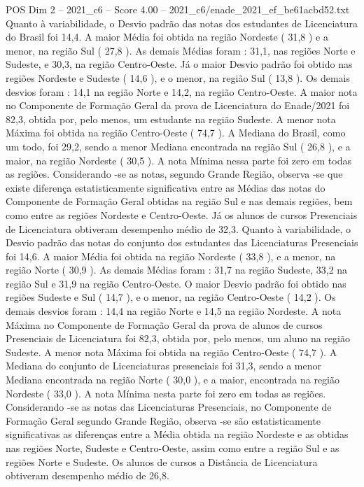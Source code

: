 \begin{textsample}{POS Dim 2 – 2021\_c6 – Score 4.00 – 2021\_c6/enade\_2021\_ef\_be61acbd52.txt}
Quanto à variabilidade, o Desvio padrão das notas dos estudantes de Licenciatura do Brasil foi 14,4.
A maior Média foi obtida na região Nordeste ( 31,8 ) e a menor, na região Sul ( 27,8 ).
As demais Médias foram : 31,1, nas regiões Norte e Sudeste, e 30,3, na região Centro-Oeste.
Já o maior Desvio padrão foi obtido nas regiões Nordeste e Sudeste ( 14,6 ), e o menor, na região Sul ( 13,8 ).
Os demais desvios foram : 14,1 na região Norte e 14,2, na região Centro-Oeste.
A maior nota no Componente de Formação Geral da prova de Licenciatura do Enade/2021 foi 82,3, obtida por, pelo menos, um estudante na região Sudeste.
A menor nota Máxima foi obtida na região Centro-Oeste ( 74,7 ).
A Mediana do Brasil, como um todo, foi 29,2, sendo a menor Mediana encontrada na região Sul ( 26,8 ), e a maior, na região Nordeste ( 30,5 ).
A nota Mínima nessa parte foi zero em todas as regiões.
Considerando -se as notas, segundo Grande Região, observa -se que existe diferença estatisticamente significativa entre as Médias das notas do Componente de Formação Geral obtidas na região Sul e nas demais regiões, bem como entre as regiões Nordeste e Centro-Oeste.
Já os alunos de cursos Presenciais de Licenciatura obtiveram desempenho médio de 32,3.
Quanto à variabilidade, o Desvio padrão das notas do conjunto dos estudantes das Licenciaturas Presenciais foi 14,6.
A maior Média foi obtida na região Nordeste ( 33,8 ), e a menor, na região Norte ( 30,9 ).
As demais Médias foram : 31,7 na região Sudeste, 33,2 na região Sul e 31,9 na região Centro-Oeste.
O maior Desvio padrão foi obtido nas regiões Sudeste e Sul ( 14,7 ), e o menor, na região Centro-Oeste ( 14,2 ).
Os demais desvios foram : 14,4 na região Norte e 14,5 na região Nordeste.
A nota Máxima no Componente de Formação Geral da prova de alunos de cursos Presenciais de Licenciatura foi 82,3, obtida por, pelo menos, um aluno na região Sudeste.
A menor nota Máxima foi obtida na região Centro-Oeste ( 74,7 ).
A Mediana do conjunto de Licenciaturas presenciais foi 31,3, sendo a menor Mediana encontrada na região Norte ( 30,0 ), e a maior, encontrada na região Nordeste ( 33,0 ).
A nota Mínima nesta parte foi zero em todas as regiões.
Considerando -se as notas das Licenciaturas Presenciais, no Componente de Formação Geral segundo Grande Região, observa -se são estatisticamente significativas as diferenças entre a Média obtida na região Nordeste e as obtidas nas regiões Norte, Sudeste e Centro-Oeste, assim como entre a região Sul e as regiões Norte e Sudeste.
Os alunos de cursos a Distância de Licenciatura obtiveram desempenho médio de 26,8.

\end{textsample}
